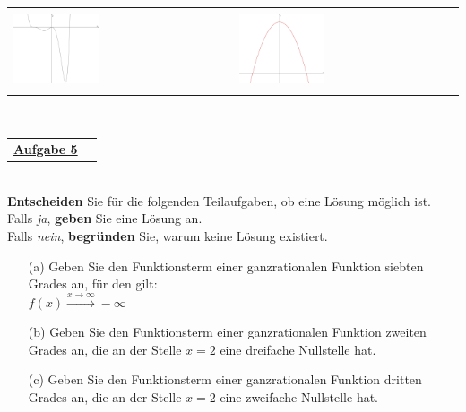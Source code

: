 \documentclass[oneside,openany,headings=optiontotoc,11pt,numbers=noenddot]{scrreprt}
\begin{document}
	\begin{tabularx}{\textwidth}{M|M}
		& \\
		\includegraphics[width=0.4\textwidth,align=c]{../99_Bilder/2VKA/Vm.png} & \includegraphics[width=0.4\textwidth,align=c]{../99_Bilder/2VKA/Vg.png}\\
		\\
	\end{tabularx}\\
	\par\noindent
	\begin{tabularx}{\textwidth}{Xl}\underline{\textbf{Aufgabe 5}}&\end{tabularx}\\
	\textbf{Entscheiden} Sie für die folgenden Teilaufgaben, ob eine Lösung möglich ist.\\
	\indent
	Falls \textit{ja}, \textbf{geben} Sie eine Lösung an.\\
	\indent
	Falls \textit{nein}, \textbf{begründen} Sie, warum keine Lösung existiert.
	\begin{itemize}
		\item[(a)] Geben Sie den Funktionsterm einer ganzrationalen Funktion siebten Grades an, für den gilt:\\
		\(f(x) \xrightarrow{x\rightarrow\infty}-\infty\)
		\item[(b)] Geben Sie den Funktionsterm einer ganzrationalen Funktion zweiten Grades an, die an der Stelle \(x = 2\) eine dreifache Nullstelle hat.
		\item[(c)] Geben Sie den Funktionsterm einer ganzrationalen Funktion dritten Grades an, die an der Stelle \(x = 2\) eine zweifache Nullstelle hat.
	\end{itemize}
\end{document}
